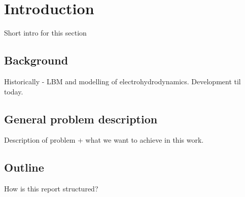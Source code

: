 \chapter{Introduction}
Short intro for this section

\section{Background}
Historically - LBM and modelling of electrohydrodynamics. Development
til today.

\section{General problem description}
Description of problem + what we want to achieve in this work.

\section{Outline}
How is this report structured?


